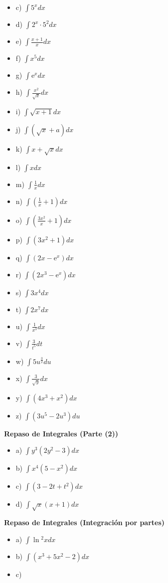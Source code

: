 \documentclass{../oxmathproblems}
\begin{document}
\begin{questions}
\begin{itemize}
\item c) $ \int 5^x dx  $ 
\item d) $ \int 2^x \cdot 5^2 dx $ 
\item e) $ \int \frac{x+1}{x} dx $ 
\item f) $ \int x^5 dx $ 
\item g) $ \int \mathrm{e}^x dx $ 
\item h) $ \int \frac{x^2}{\sqrt{x}} dx $ 
\item i) $ \int  \sqrt{x+1} dx $ 
\item j) $ \int  (\sqrt{x} + a) dx $ 
\item k) $ \int x + \sqrt{x} dx $ 
\item l) $ \int x  dx $ 
\item m) $ \int \frac{1}{x} dx  $
\item n) $ \int (\frac{1}{x} + 1) dx $
\item o) $ \int (\frac{3x^2}{x} + 1 ) dx $ 
\item p) $ \int (3x^2 + 1 ) dx $ 
\item q) $ \int (2x - \mathrm{e}^x ) dx $ 
\item r) $ \int (2x^3 - \mathrm{e}^x ) dx $ 
\item s) $ \int 3x^4 dx $ 
\item t)  $ \int 2x^7 dx $ 
\item u)  $ \int \frac{1}{x^3} dx $ 
\item v) $ \int \frac{3}{t^5} dt $ 
\item w) $ \int 5u^{\frac{3}{2}} du $ 
\item x) $ \int  \frac{3}{\sqrt{y}} dx $ 
\item y) $ \int (4x^3 + x^2) dx $ 
\item z) $ \int (3u^5 - 2u^3) du $ 

\end{itemize}



\miquestion \textbf{Repaso de Integrales (Parte (2))}
\begin{itemize}
\item a) $ \int y^3(2y^2 - 3) dx $ 
\item b) $ \int x^4(5 - x^2) dx $ 
\item c) $ \int (3 -2t + t^2) dx $ 
\item d) $ \int \sqrt{x}(x+1) dx $ 
\end{itemize}

\miquestion \textbf{Repaso de Integrales (Integración por partes)}
\begin{itemize}
\item a) $ \int \ln{^2}x dx $ 
\item b) $ \int (x^3 + 5x^2 - 2) dx $ 
\item c) 
\end{itemize}



\end{questions}
\end{document}
